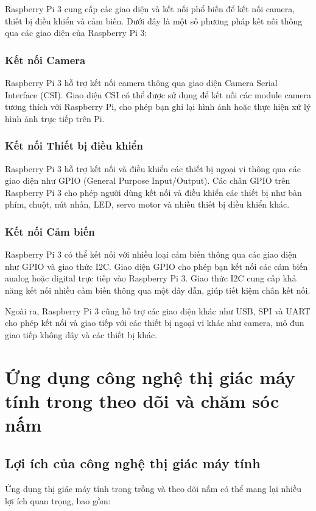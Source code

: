 Raspberry Pi 3 cung cấp các giao diện và kết nối phổ biến để kết nối camera, thiết bị điều khiển và cảm biến. Dưới đây là một số phương pháp kết nối thông qua các giao diện của Raspberry Pi 3:

\subsubsection{Kết nối Camera}
Raspberry Pi 3 hỗ trợ kết nối camera thông qua giao diện Camera Serial Interface (CSI). Giao diện CSI có thể được sử dụng để kết nối các module camera tương thích với Raspberry Pi, cho phép bạn ghi lại hình ảnh hoặc thực hiện xử lý hình ảnh trực tiếp trên Pi.

\subsubsection{Kết nối Thiết bị điều khiển}
Raspberry Pi 3 hỗ trợ kết nối và điều khiển các thiết bị ngoại vi thông qua các giao diện như GPIO (General Purpose Input/Output). Các chân GPIO trên Raspberry Pi 3 cho phép người dùng kết nối và điều khiển các thiết bị như bàn phím, chuột, nút nhấn, LED, servo motor và nhiều thiết bị điều khiển khác.

\subsubsection{Kết nối Cảm biến}
Raspberry Pi 3 có thể kết nối với nhiều loại cảm biến thông qua các giao diện như GPIO và giao thức I2C. Giao diện GPIO cho phép bạn kết nối các cảm biến analog hoặc digital trực tiếp vào Raspberry Pi 3. Giao thức I2C cung cấp khả năng kết nối nhiều cảm biến thông qua một dây dẫn, giúp tiết kiệm chân kết nối.

Ngoài ra, Raspberry Pi 3 cũng hỗ trợ các giao diện khác như USB, SPI và UART cho phép kết nối và giao tiếp với các thiết bị ngoại vi khác như camera, mô đun giao tiếp không dây và các thiết bị khác.

\section{Ứng dụng công nghệ thị giác máy tính trong theo dõi và chăm sóc nấm}

\subsection{Lợi ích của công nghệ thị giác máy tính}

Ứng dụng thị giác máy tính trong trồng và theo dõi nấm có thể mang lại nhiều lợi ích quan trọng, bao gồm:

